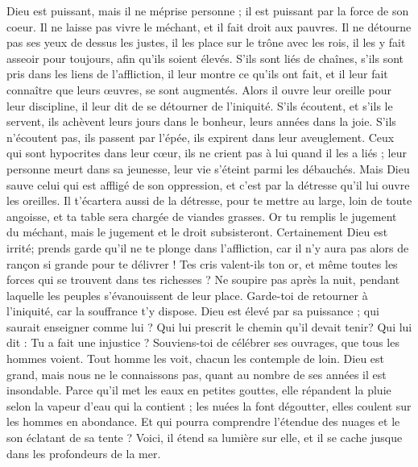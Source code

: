\begin{multicols}{2}
{Dieu est puissant, mais il ne méprise personne ; il est puissant par la force de son coeur.
Il ne laisse pas vivre le méchant, et il fait droit aux pauvres.
Il ne détourne pas ses yeux de dessus les justes, il les place sur le trône avec les rois, il les y fait asseoir pour toujours, afin qu'ils soient élevés.
S'ils sont liés de chaînes, s'ils sont pris dans les liens de l'affliction,
il leur montre ce qu'ils ont fait, et il leur fait connaître que leurs œuvres, se sont augmentés.
Alors il ouvre leur oreille pour leur discipline, il leur dit de se détourner de l'iniquité.
S'ils écoutent, et s'ils le servent, ils achèvent leurs jours dans le bonheur, leurs années dans la joie.
S'ils n'écoutent pas, ils passent par l'épée, ils expirent dans leur aveuglement.
Ceux qui sont hypocrites dans leur cœur, ils ne crient pas à lui quand il les a liés ;
leur personne meurt dans sa jeunesse, leur vie s'éteint parmi les débauchés.
Mais Dieu sauve celui qui est affligé de son oppression, et c'est par la détresse qu'il lui ouvre les oreilles.
Il t'écartera aussi de la détresse, pour te mettre au large, loin de toute angoisse, et ta table sera chargée de viandes grasses.
Or tu remplis le jugement du méchant, mais le jugement et le droit subsisteront.
Certainement Dieu est irrité; prends garde qu'il ne te  plonge dans l'affliction, car il n'y aura pas alors de rançon si grande pour te délivrer !
Tes cris valent-ils ton or, et même toutes les forces qui se trouvent dans tes richesses ?
Ne soupire pas après la nuit, pendant laquelle les peuples s'évanouissent de leur place.
Garde-toi de retourner à l'iniquité, car la souffrance t'y dispose.
Dieu est élevé par sa puissance ; qui saurait enseigner comme lui ?
Qui lui prescrit le chemin qu'il devait tenir? Qui lui dit : Tu a fait une injustice ?
Souviens-toi de célébrer ses ouvrages, que tous les hommes voient.
Tout homme les voit, chacun les contemple de loin.
Dieu est grand, mais nous ne le connaissons pas, quant au nombre de ses années il est insondable.
Parce qu'il met les eaux  en petites gouttes, elle répandent la pluie selon la vapeur d'eau qui la contient ;
les nuées la font dégoutter, elles coulent sur les hommes en abondance.
Et qui pourra comprendre l'étendue des nuages et le son éclatant de sa tente ?
Voici, il étend sa lumière sur elle, et il se cache jusque dans les profondeurs de la mer.
}
\end{multicols}
